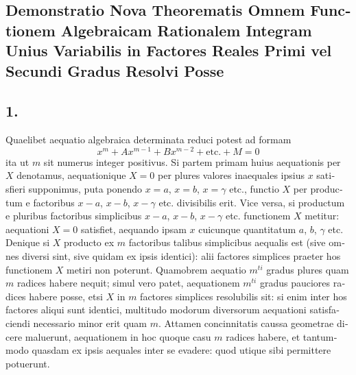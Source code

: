 \documentclass[12pt,a4paper]{article}
\begin{document}
\clearpage
\setcounter{page}{3}

\begin{otherlanguage}{latin}
\section*{\centering Demonstratio Nova Theorematis Omnem Functionem Algebraicam Rationalem Integram Unius Variabilis in Factores Reales Primi vel Secundi Gradus Resolvi Posse}

\subsection*{1.}
Quaelibet aequatio algebraica determinata reduci potest ad formam
\[x^{m}+Ax^{m-1}+Bx^{m-2}+\text{etc.}+M=0\]
ita ut $m$ sit numerus integer positivus. Si partem primam huius aequationis per $X$ denotamus, aequationique $X=0$ per plures valores inaequales ipsius $x$ satisfieri supponimus, puta ponendo $x=a$, $x=b$, $x=\gamma$ etc., functio $X$ per productum e factoribus $x-a$, $x-b$, $x-\gamma$ etc. divisibilis erit. Vice versa, si productum e pluribus factoribus simplicibus $x-a$, $x-b$, $x-\gamma$ etc. functionem $X$ metitur: aequationi $X=0$ satisfiet, aequando ipsam $x$ cuicunque quantitatum $a$, $b$, $\gamma$ etc. Denique si $X$ producto ex $m$ factoribus talibus simplicibus aequalis est (sive omnes diversi sint, sive quidam ex ipsis identici): alii factores simplices praeter hos functionem $X$ metiri non poterunt. Quamobrem aequatio $m^{ti}$ gradus plures quam $m$ radices habere nequit; simul vero patet, aequationem $m^{ti}$ gradus pauciores radices habere posse, etsi $X$ in $m$ factores simplices resolubilis sit: si enim inter hos factores aliqui sunt identici, multitudo modorum diversorum aequationi satisfaciendi necessario minor erit quam $m$. Attamen concinnitatis caussa geometrae dicere maluerunt, aequationem in hoc quoque casu $m$ radices habere, et tantummodo quasdam ex ipsis aequales inter se evadere: quod utique sibi permittere potuerunt.


\end{otherlanguage}
\end{document}
